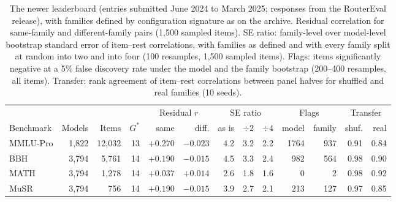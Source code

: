 \begin{table}[!htb]\centering\footnotesize\setlength{\tabcolsep}{3.5pt}
\caption{The newer leaderboard (entries submitted June 2024 to March 2025; responses from the RouterEval release), with families defined by configuration signature as on the archive. Residual correlation for same-family and different-family pairs (1,500 sampled items). SE ratio: family-level over model-level bootstrap standard error of item--rest correlations, with families as defined and with every family split at random into two and into four (100 resamples, 1,500 sampled items). Flags: items significantly negative at a 5\% false discovery rate under the model and the family bootstrap (200--400 resamples, all items). Transfer: rank agreement of item--rest correlations between panel halves for shuffled and real families (10 seeds).}\label{tab:vtwo}
\begin{tabular}{lrrr|rr|rrr|rr|rr}
\toprule
 & & & & \multicolumn{2}{c|}{Residual $r$} & \multicolumn{3}{c|}{SE ratio} & \multicolumn{2}{c|}{Flags} & \multicolumn{2}{c}{Transfer}\\
Benchmark & Models & Items & $G^\ast$ & same & diff. & as is & $\div2$ & $\div4$ & model & family & shuf. & real\\
\midrule
MMLU-Pro & 1,822 & 12,032 & 13 & $+0.270$ & $-0.023$ & 4.2 & 3.2 & 2.2 & 1764 & 937 & 0.91 & 0.84\\
BBH & 3,794 & 5,761 & 14 & $+0.190$ & $-0.015$ & 4.5 & 3.3 & 2.4 & 982 & 564 & 0.98 & 0.90\\
MATH & 3,794 & 1,278 & 14 & $+0.037$ & $+0.014$ & 2.6 & 1.8 & 1.6 & 0 & 2 & 0.98 & 0.92\\
MuSR & 3,794 & 756 & 14 & $+0.190$ & $-0.015$ & 3.9 & 2.7 & 2.1 & 213 & 127 & 0.97 & 0.85\\
\bottomrule
\end{tabular}
\end{table}
